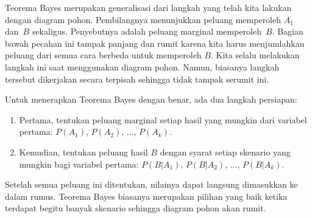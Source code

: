 Teorema Bayes merupakan generalisasi dari langkah yang telah kita lakukan
dengan diagram pohon.
Pembilangnya menunjukkan peluang memperoleh
$A_1$ dan~$B$ sekaligus.
Penyebutnya adalah peluang marginal memperoleh~$B$.
Bagian bawah pecahan ini tampak panjang dan
rumit karena kita harus menjumlahkan peluang dari semua cara berbeda untuk memperoleh $B$. Kita selalu melakukan langkah ini saat menggunakan diagram pohon. Namun, biasanya langkah tersebut dikerjakan secara terpisah sehingga tidak tampak serumit ini.

\noindent%
Untuk menerapkan Teorema Bayes dengan benar, ada dua langkah persiapan:
\begin{enumerate}
\setlength{\itemsep}{0mm}
\item[(1)] Pertama, tentukan peluang marginal setiap hasil yang mungkin dari variabel pertama: $P(A_1)$, $P(A_2)$, ..., $P(A_k)$.
\item[(2)] Kemudian, tentukan peluang hasil $B$ dengan syarat setiap skenario yang mungkin bagi variabel pertama: $P(B | A_1)$, $P(B | A_2)$, ..., $P(B | A_k)$.
\end{enumerate}
Setelah semua peluang ini ditentukan, nilainya dapat langsung dimasukkan ke dalam rumus.
Teorema Bayes biasanya merupakan pilihan yang baik ketika terdapat begitu banyak skenario sehingga diagram pohon akan rumit.

